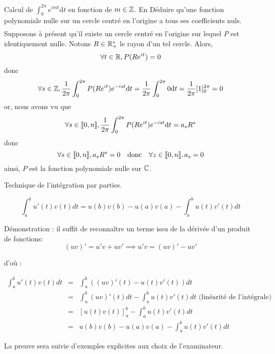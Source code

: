 \documentclass{article}
\begin{document}
\begin{question_kholle}{Calcul de $\displaystyle\int_0^{2\pi}e^{imt} \mathrm d t$ en fonction de $m \in \mathbb Z$. En Déduire qu'une fonction polynomiale nulle sur un cercle centré en l'origine a tous ses coefficients nuls.}
\begin{align*}
    \end{align*}
    Supposons à présent qu'il existe un cercle centré en l'origine sur lequel $P$ est identiquement nulle. Notons $R\in\mathbb R_+^*$ le rayon d'un tel cercle. Alors,
    \[
        \forall t\in\mathbb R, P(Re^{it})=0
    \]
    donc
    \[
        \forall s\in\mathbb Z, \frac{1}{2\pi}\int_0^{2\pi}P(Re^{it})e^{-ist}\mathrm d t = \frac{1}{2\pi}\int_0^{2\pi}0\mathrm d t=\frac{1}{2\pi}[1]_0^{2\pi}=0
    \]
    or, nous avons vu que
    \[
        \forall s\in[\![ 0,n ]\!], \frac{1}{2\pi}\int_0^{2\pi}P(Re^{it})e^{-ist}\mathrm d t = a_s R^s
    \]
    donc
    \[
        \forall s\in[\![ 0,n ]\!], a_sR^s = 0 \quad\text{donc}\quad \forall z\in[\![ 0,n ]\!], a_s = 0
    \]
    ainsi, $P$ est la fonction polynomiale nulle sur $\mathbb C$.
\end{question_kholle}


\pagebreak

\begin{question_kholle}{Technique de l'intégration par parties.}



$$
\int_{a}^{b} u'(t)v(t) dt= u(b)v(b) - u(a)v(a) - \int_{a}^{b} u(t)v'(t) dt
$$

Démonstration : il suffit de reconnaître un terme issu de la dérivée d'un produit de fonctions:
$$
(uv)' = u'v + uv' \implies u'v = (uv)' - uv'
$$

d'où :

\begin{eqnarray*}
	\int_{a}^{b} u'(t)v(t)dt &=& \int_{a}^{b} ((uv)'(t) - u(t)v'(t)) dt \\
	&=& \int_{a}^{b} (uv)'(t)dt - \int_{a}^{b}u(t)v'(t)dt  \text{ (linéarité de l'intégrale)} \\
	&=& \left[ u(t)v(t)\right]_{a}^{b} - \int_{a}^{b} u(t)v'(t)dt \\
	&=& u(b)v(b) - u(a)v(a) - \int_{a}^{b} u(t)v'(t)dt
\end{eqnarray*}

La preuve sera suivie d'exemples explicites aux choix de l'examinateur.

\end{question_kholle}
\end{document}
